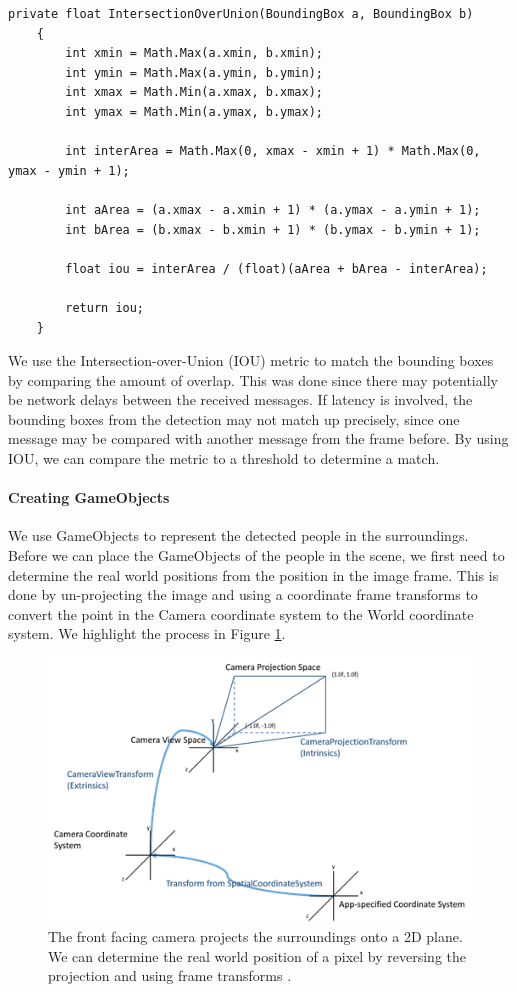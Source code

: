 \begin{lstlisting}[language={[Sharp]C},caption={IOU metric C\# implementation.}]
private float IntersectionOverUnion(BoundingBox a, BoundingBox b)
    {
        int xmin = Math.Max(a.xmin, b.xmin);
        int ymin = Math.Max(a.ymin, b.ymin);
        int xmax = Math.Min(a.xmax, b.xmax);
        int ymax = Math.Min(a.ymax, b.ymax);

        int interArea = Math.Max(0, xmax - xmin + 1) * Math.Max(0, ymax - ymin + 1);

        int aArea = (a.xmax - a.xmin + 1) * (a.ymax - a.ymin + 1);
        int bArea = (b.xmax - b.xmin + 1) * (b.ymax - b.ymin + 1);

        float iou = interArea / (float)(aArea + bArea - interArea);

        return iou;
    }
\end{lstlisting}

We use the Intersection-over-Union (IOU) metric to match the bounding boxes by comparing the amount of overlap. This was done since there may potentially be network delays between the received messages. If latency is involved, the bounding boxes from the detection may not match up precisely, since one message may be compared with another message from the frame before. By using IOU, we can compare the metric to a threshold to determine a match.

\paragraph{Creating GameObjects} We use GameObjects to represent the detected people in the surroundings. Before we can place the GameObjects of the people in the scene, we first need to determine the real world positions from the position in the image frame. This is done by un-projecting the image and using a coordinate frame transforms to convert the point in the Camera coordinate system to the World coordinate system. We highlight the process in Figure \ref{fig:cameraProjection}.

\begin{figure}[ht]
    \centering
    \includegraphics[width=0.8\linewidth]{img/chapter5_implementation/CameraTransform.png}
    \caption{The front facing camera projects the surroundings onto a 2D plane. We can determine the real world position of a pixel by reversing the projection and using frame transforms \cite{Microsofta}.}
    \label{fig:cameraProjection}
\end{figure}

